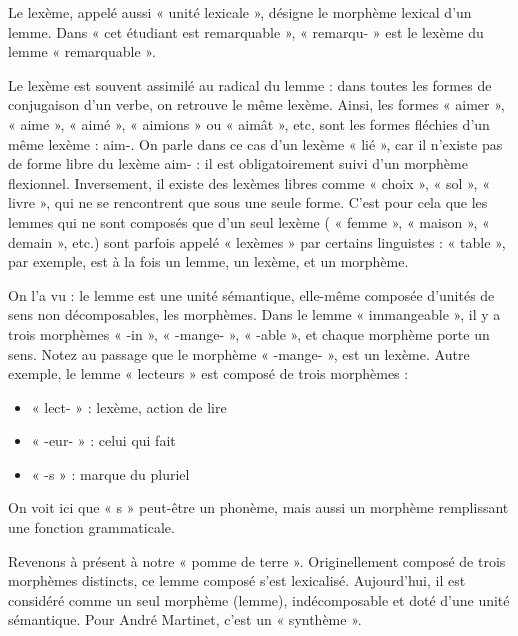 Le lexème, appelé aussi « unité lexicale », désigne le morphème lexical d’un lemme. Dans « cet étudiant est remarquable », « remarqu- » est le lexème du lemme « remarquable ».

Le lexème est souvent assimilé au radical du lemme : dans toutes les formes de conjugaison d’un verbe, on retrouve le même lexème. Ainsi, les formes « aimer », « aime », « aimé », « aimions » ou « aimât », etc, sont les formes fléchies d’un même lexème : aim-. On parle dans ce cas d’un lexème « lié », car il n’existe pas de forme libre du lexème aim- : il est obligatoirement suivi d’un morphème flexionnel. Inversement, il existe des lexèmes libres comme « choix », « sol », « livre », qui ne se rencontrent que sous une seule forme. C’est pour cela que les lemmes qui ne sont composés que d’un seul lexème ( « femme », « maison », « demain », etc.) sont parfois appelé « lexèmes » par certains linguistes : « table », par exemple, est à la fois un lemme, un lexème, et un
morphème.

On l’a vu : le lemme est une unité sémantique, elle-même composée d’unités de sens non décomposables, les morphèmes. Dans le lemme « immangeable », il y a trois morphèmes « -in », « -mange- », « -able », et chaque morphème porte un sens. Notez au passage que le morphème « -mange- », est un lexème. Autre exemple, le lemme « lecteurs » est composé de trois morphèmes :
\begin{itemize}
\item « lect- » : lexème, action de lire
\item « -eur- » : celui qui fait
\item « -s » : marque du pluriel
\end{itemize}
On voit ici que « s » peut-être un phonème, mais aussi un morphème remplissant une fonction grammaticale.

Revenons à présent à notre « pomme de terre ». Originellement composé de trois morphèmes distincts, ce lemme composé s’est lexicalisé. Aujourd’hui, il est considéré comme un seul morphème (lemme), indécomposable et doté d’une unité sémantique. Pour André Martinet, c’est un « synthème ».

